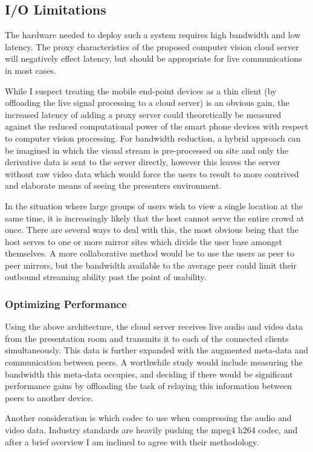 \documentclass[a4paper,12pt]{report}
\begin{document}
	\subsection{I/O Limitations}

The hardware needed to deploy such a system requires high bandwidth and low latency. The proxy characteristics of the proposed computer vision cloud server will negatively effect latency, but should be appropriate for live communications in most cases.

While I suspect treating the mobile end-point devices as a thin client (by offloading the live signal processing to a cloud server) is an obvious gain, the increased latency of adding a proxy server could theoretically be measured against the reduced computational power of the smart phone devices with respect to computer vision processing. For bandwidth reduction, a hybrid approach can be imagined in which the visual stream is pre-processed on site and only the derivative data is sent to the server directly, however this leaves the server without raw video data which would force the users to result to more contrived and elaborate means of seeing the presenters environment.

In the situation where large groups of users wish to view a single location at the same time, it is increasingly likely that the host cannot serve the entire crowd at once. There are several ways to deal with this, the most obvious being that the host serves to one or more mirror sites which divide the user base amongst themselves. A more collaborative method would be to use the users as peer to peer mirrors, but the bandwidth available to the average peer could limit their outbound streaming ability past the point of usability.

	\subsubsection{Optimizing Performance}
Using the above architecture, the cloud server receives live audio and video data from the presentation room and transmits it to each of the connected clients simultaneously. This data is further expanded with the augmented meta-data and communication between peers. A worthwhile study would include measuring the bandwidth this meta-data occupies, and deciding if there would be significant performance gains by offloading the task of relaying this information between peers to another device.

Another consideration is which codec to use when compressing the audio and video data. Industry standards are heavily pushing the mpeg4 h264 codec, and after a brief overview I am inclined to agree with their methodology.
\end{document}
